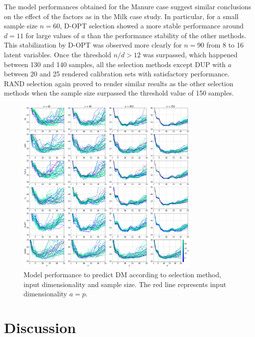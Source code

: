 \documentclass[journal=ancham,manuscript=article]{achemso}
\begin{document}
The model performances obtained for the Manure case suggest similar conclusions on the effect of the factors as in the Milk case study. In particular, for a small sample size $n=60$, D-OPT selection showed a more stable performance around $d = 11$ for large values of $a$ than the performance stability of the other methods. This stabilization by D-OPT was observed more clearly for $n=90$ from 8 to 16 latent variables. Once the threshold $n/d>12$ was surpassed, which happened between 130 and 140 samples, all the selection methods except DUP with $a$ between 20 and 25 rendered calibration sets with satisfactory performance. RAND selection again proved to render similar results as the other selection methods when the sample size surpassed the threshold value of 150 samples. 




\begin{figure}[b]
\includegraphics[width=0.8\textwidth]{manuscript/figures/d02_manure_model_performance.png}
\centering
\caption{Model performance to predict DM according to selection method, input dimensionality and sample size. The red line represents input dimensionality $a=p$.}
\label{fig_d02_manure_model_performance}
\end{figure}




\section*{Discussion}\label{discussion}
\end{document}
